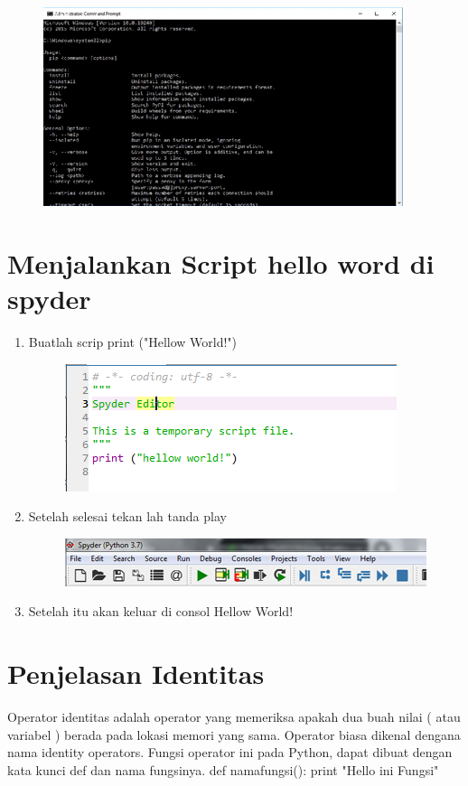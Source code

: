 \begin{enumerate}
\begin{figure}[!htbp]
    \centering
    \includegraphics[scale=0.5]{figures/6.png}
    \label{visimisi}
\end{figure}
\end{enumerate}

\section{Menjalankan Script hello word di spyder}
\begin{enumerate}
    \item Buatlah scrip print ("Hellow World!")
\begin{figure}[!htbp]
    \centering
    \includegraphics[scale=0.7]{figures/7.png}
    \label{visimisi}
\end{figure}

    \item Setelah selesai tekan lah tanda play 
\begin{figure}[!htbp]
    \centering
    \includegraphics[scale=0.7]{figures/8.png}
    \label{visimisi}
\end{figure}
     \item Setelah itu akan keluar di consol Hellow World!
\end{enumerate}

\section{Penjelasan Identitas}
Operator identitas adalah operator yang memeriksa apakah dua buah nilai ( atau variabel ) berada pada lokasi memori yang sama. Operator biasa dikenal dengana nama identity operators.
Fungsi operator ini pada Python, dapat dibuat dengan kata kunci def dan nama fungsinya.
    def namafungsi():
    print "Hello ini Fungsi"
    
